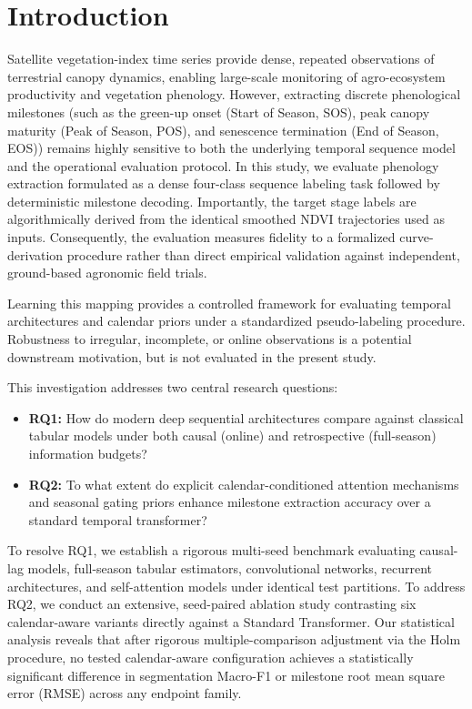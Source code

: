 \documentclass[runningheads]{llncs}
\begin{document}
\section{Introduction}
Satellite vegetation-index time series provide dense, repeated observations of terrestrial canopy dynamics, enabling large-scale monitoring of agro-ecosystem productivity and vegetation phenology. However, extracting discrete phenological milestones (such as the green-up onset (Start of Season, SOS), peak canopy maturity (Peak of Season, POS), and senescence termination (End of Season, EOS)) remains highly sensitive to both the underlying temporal sequence model and the operational evaluation protocol. In this study, we evaluate phenology extraction formulated as a dense four-class sequence labeling task followed by deterministic milestone decoding. Importantly, the target stage labels are algorithmically derived from the identical smoothed NDVI trajectories used as inputs. Consequently, the evaluation measures fidelity to a formalized curve-derivation procedure rather than direct empirical validation against independent, ground-based agronomic field trials.

Learning this mapping provides a controlled framework for evaluating temporal architectures and calendar priors under a standardized pseudo-labeling procedure. Robustness to irregular, incomplete, or online observations is a potential downstream motivation, but is not evaluated in the present study.

This investigation addresses two central research questions:
\begin{itemize}
    \item \textbf{RQ1:} How do modern deep sequential architectures compare against classical tabular models under both causal (online) and retrospective (full-season) information budgets?
    \item \textbf{RQ2:} To what extent do explicit calendar-conditioned attention mechanisms and seasonal gating priors enhance milestone extraction accuracy over a standard temporal transformer?
\end{itemize}

To resolve RQ1, we establish a rigorous multi-seed benchmark evaluating causal-lag models, full-season tabular estimators, convolutional networks, recurrent architectures, and self-attention models under identical test partitions. To address RQ2, we conduct an extensive, seed-paired ablation study contrasting six calendar-aware variants directly against a Standard Transformer. Our statistical analysis reveals that after rigorous multiple-comparison adjustment via the Holm procedure, no tested calendar-aware configuration achieves a statistically significant difference in segmentation Macro-F1 or milestone root mean square error (RMSE) across any endpoint family.
\end{document}
